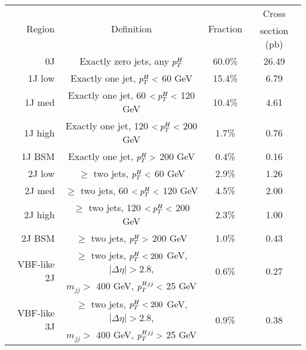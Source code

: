 \begin{tabular}{ r | c | c | c } 
\hline
\multirow{2}{*}{Region}      & \multirow{2}{*}{Definition}                             & \multirow{2}{*}{Fraction} & Cross \\ 
                             &                                                         &                           & section (pb) \\ 
\hline
0J                           & Exactly zero jets, any $p_T^H$                           & 60.0\%                    & 26.49 \\ 
\hline
1J low                       & Exactly one jet, $p_T^H <$ 60 GeV                        & 15.4\%                    & 6.79  \\
\hline
1J med                       & Exactly one jet, 60 $< p_T^H <$ 120 GeV                  & 10.4\%                    & 4.61  \\ 
\hline
1J high                      & Exactly one jet, 120 $< p_T^H <$ 200 GeV                 & 1.7\%                     & 0.76   \\
\hline
1J BSM                       & Exactly one jet, $p_T^H >$ 200 GeV                       & 0.4\%                     & 0.16   \\ 
\hline
2J low                       & $\ge$ two jets, $p_T^H <$ 60 GeV                         & 2.9\%                     & 1.26   \\
\hline
2J med                       & $\ge$ two jets, 60 $< p_T^H <$ 120 GeV                   & 4.5\%                     & 2.00   \\ 
\hline
2J high                      & $\ge$ two jets, 120 $< p_T^H <$ 200 GeV                  & 2.3\%                     & 1.00   \\
\hline
2J BSM                       & $\ge$ two jets, $p_T^H >$ 200 GeV                        & 1.0\%                     & 0.43   \\ 
\hline
\multirow{2}{*}{VBF-like 2J} & $\ge$ two jets, $p_T^H < 200$ GeV, $|\Delta\eta| > 2.8$, & \multirow{2}{*}{0.6\%}    & \multirow{2}{*}{0.27} \\ 
                             & $m_{jj} >$ 400 GeV, $p_T^{Hjj} <$ 25 GeV                   &                           & \\ 
\hline
\multirow{2}{*}{VBF-like 3J} & $\ge$ two jets, $p_T^H < 200$ GeV, $|\Delta\eta| > 2.8$, & \multirow{2}{*}{0.9\%}    & \multirow{2}{*}{0.38} \\ 
                             & $m_{jj} >$ 400 GeV, $p_T^{Hjj} >$ 25 GeV                   &                           & \\ 
\hline
\end{tabular}
